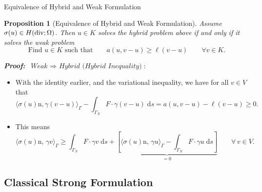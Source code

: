\documentclass[10pt,aspectratio=169]{beamer}
\newtheorem{proposition}{Proposition}[section]
\def\d{{\mathrm{d}}}
\def\ds{{\d s}}
\newcommand{\diver}{\operatornamewithlimits{div}}
\begin{document}
\begin{frame}{Equivalence of Hybrid and Weak Formulation}
	\begin{proposition}[Equivalence of Hybrid and Weak Formulation]
		Assume $\sigma(u)\in H(\diver;\Omega)$. Then $u\in K$ solves the hybrid problem above if and only if it solves the weak problem
		\begin{equation*}
			\text{Find }u\in K\text{ such that}\qquad a(u,v-u)\ge\ell(v-u)\qquad \forall v\in K.
		\end{equation*}
	\end{proposition}
	\textbf{\em Proof:} $\ \textit{Weak }\Rightarrow\textit{ Hybrid (Hybrid Inequality)}$:
	\begin{itemize}
		\item With the identity earlier, and the variational inequality, we have for all $v\in V$ that
		      \begin{equation*}
			      \langle \sigma(u)\mathrm n,\gamma(v-u)\rangle_\Gamma - \int_{\Gamma_N}F\cdot\gamma(v-u)\;\ds = a(u,v-u)-\ell(v-u)\ge 0.
		      \end{equation*}

		\item This means
		      \begin{equation*}
			      \langle\sigma(u)\mathrm{n},\,\gamma v\rangle_\Gamma\ge \int_{\Gamma_N}F\cdot \gamma v\;\ds + \underbrace{\left[\langle\sigma(u)\mathrm{n},\,\gamma u\rangle_\Gamma-\int_{\Gamma_N}F\cdot\gamma u\;\ds\right]}_{ = 0}\qquad \forall\,v\in V.
		      \end{equation*}
	\end{itemize}
\end{frame}

\subsection{Classical Strong Formulation}
\end{document}
